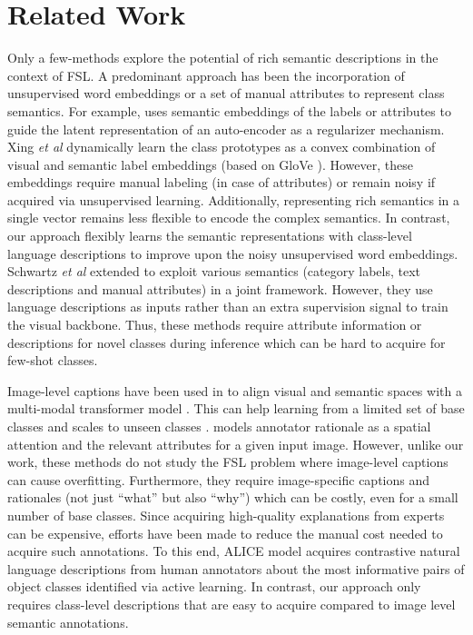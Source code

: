 \documentclass{bmvc2k}
\def\etal{\emph{et al}\bmvaOneDot}
\begin{document}
\section{Related Work}
Only a few-methods explore the potential of rich semantic descriptions in the context of FSL. A predominant approach has been the incorporation of unsupervised word embeddings or a set of manual attributes to represent class semantics. For example, \cite{chen2019multi} uses semantic embeddings of the labels or attributes to guide the latent representation of an auto-encoder as a regularizer mechanism.  Xing \etal \cite{xing2019adaptive} dynamically learn the class prototypes as a convex combination of visual and semantic label embeddings (based on GloVe \cite{pennington2014glove}). However, these embeddings require manual labeling (in case of attributes) or remain noisy if acquired via unsupervised learning. Additionally, representing rich semantics in a single vector remains less flexible to encode the complex semantics. In contrast, our approach flexibly learns the semantic representations with class-level language descriptions to improve upon the noisy unsupervised word embeddings. Schwartz \etal \cite{schwartz2019baby} extended \cite{xing2019adaptive}  to exploit various semantics (category labels, text descriptions and manual attributes) in a joint framework. However, they use language descriptions as inputs rather than an extra supervision signal to train the visual backbone. Thus, these methods \cite{xing2019adaptive,schwartz2019baby} require attribute information or descriptions for novel classes during inference which can be hard to acquire for few-shot classes.

Image-level captions have been used in \cite{zareian2020open,desai2020virtex} to align visual and semantic spaces with a multi-modal transformer model \cite{khan2021transformers}. This can help learning from a limited set of base classes and scales to unseen classes \cite{zareian2020open}. \cite{Donahue2011annotator} models annotator rationale as a spatial attention and the relevant attributes for a given input image.  However, unlike our work, these methods do not study the FSL problem where image-level captions can cause overfitting. Furthermore, they require image-specific captions and rationales (not just “what” but also “why”) which can be costly, even for a small number of base classes. Since acquiring high-quality explanations \cite{mu2020shaping, andreas2017learning} from experts can be expensive, efforts have been made to reduce the manual cost needed to acquire such annotations. To this end, ALICE model \cite{liang2020alice} acquires contrastive natural language descriptions from human annotators about the most informative pairs of object classes identified via active learning. In contrast, our approach only requires class-level descriptions that are easy to acquire compared to image level semantic annotations.
\end{document}
